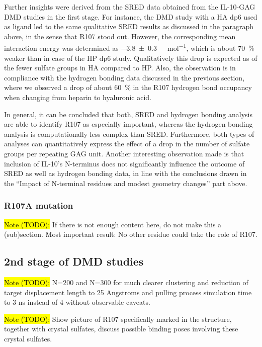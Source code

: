Further insights were derived from the SRED data obtained from the IL-10-GAG DMD
studies in the first stage. For instance, the DMD study with a HA dp6 used as
ligand led to the same qualitative SRED results as discussed in the paragraph
above, in the sense that R107 stood out. However, the corresponding mean
interaction energy was determined as \SI{-3.8 +-0.3}{\kilo\calory\per\mol},
which is about \SI{70}{\percent} weaker than in case of the HP dp6 study.
Qualitatively this drop is expected as of the fewer sulfate groups in HA
compared to HP. Also, the observation is in compliance with the hydrogen bonding
data discussed in the previous section, where we observed a drop of about
\SI{60}{\percent} in the R107 hydrogen bond occupancy when changing from heparin
to hyaluronic acid.

In general, it can be concluded that both, SRED and hydrogen bonding analysis
are able to identify R107 as especially important, whereas the hydrogen bonding
analysis is computationally less complex than SRED. Furthermore, both types of
analyses can quantitatively express the effect of a drop in the number of
sulfate groups per repeating GAG unit. Another interesting observation made is
that inclusion of IL-10's N-terminus does not significantly influence the
outcome of SRED as well as hydrogen bonding data, in line with the conclusions
drawn in the \enquote{Impact of N-terminal residues and modest geometry changes}
part above.



\subsubsection{R107A mutation}

\hl{Note (TODO):}
If there is not enough content here, do not make this a (sub)section.
Most important result: No other residue could take the role of R107.


\subsection{2nd stage of DMD studies}

\hl{Note (TODO):}
N=200 and N=300 for much clearer clustering and reduction of target displacement
length to 25 Angstroms and pulling process simulation time to 3 ns instead of 4
without observable caveats.

\hl{Note (TODO):}
Show picture of R107 specifically marked in the structure, together with
crystal sulfates, discuss possible binding poses involving these crystal
sulfates.


